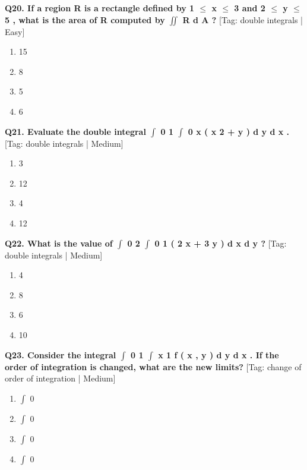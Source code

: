 \noindent\textbf{Q20. If a region R is a rectangle defined by 1 $\le$ x $\le$ 3 and 2 $\le$ y $\le$ 5 , what is the area of R computed by $\iint$ R d A ?} \hfill [Tag: double integrals | Easy]
\begin{enumerate}[label=(\alph*),topsep=2pt,itemsep=1pt,partopsep=0pt,parsep=0pt]
    \item {{15}}
    \item {{8}}
    \item {{5}}
    \item {{6}}
\end{enumerate}
\vspace{2mm}

\noindent\textbf{Q21. Evaluate the double integral $\int$ 0 1 $\int$ 0 x ( x 2 + y ) d y d x .} \hfill [Tag: double integrals | Medium]
\begin{enumerate}[label=(\alph*),topsep=2pt,itemsep=1pt,partopsep=0pt,parsep=0pt]
    \item {{3}}
    \item {{12}}
    \item {{4}}
    \item {{12}}
\end{enumerate}
\vspace{2mm}

\noindent\textbf{Q22. What is the value of $\int$ 0 2 $\int$ 0 1 ( 2 x + 3 y ) d x d y ?} \hfill [Tag: double integrals | Medium]
\begin{enumerate}[label=(\alph*),topsep=2pt,itemsep=1pt,partopsep=0pt,parsep=0pt]
    \item {{4}}
    \item {{8}}
    \item {{6}}
    \item {{10}}
\end{enumerate}
\vspace{2mm}

\noindent\textbf{Q23. Consider the integral $\int$ 0 1 $\int$ x 1 f ( x , y ) d y d x . If the order of integration is changed, what are the new limits?} \hfill [Tag: change of order of integration | Medium]
\begin{enumerate}[label=(\alph*),topsep=2pt,itemsep=1pt,partopsep=0pt,parsep=0pt]
    \item {{$\int$ 0}}
    \item {{$\int$ 0}}
    \item {{$\int$ 0}}
    \item {{$\int$ 0}}
\end{enumerate}
\vspace{2mm}

